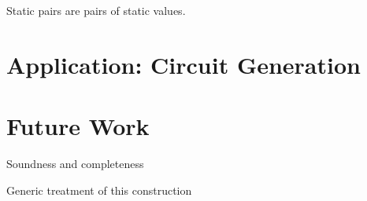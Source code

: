 \documentclass{article}
\begin{document}
Static pairs are pairs of static values.



\section{Application: Circuit Generation}

\cite{DBLP:conf/rc/GreenLRSV13,DBLP:conf/types/FlorSS15}

\section{Future Work}

Soundness and completeness
\cite{DBLP:journals/lisp/Coquand02}

Generic treatment of this construction
\cite{DBLP:journals/jfp/AllaisACMM21}


\newpage
\printbibliography
\end{document}
